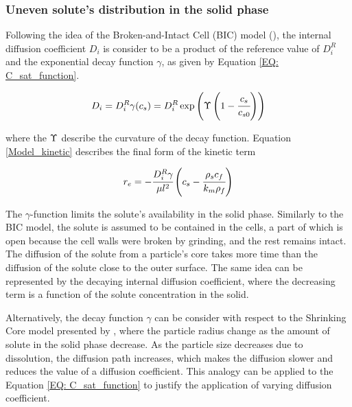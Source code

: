 \documentclass[../Article_Model_Parameters.tex]{subfiles}
\begin{document}
	
	\subsubsection{Uneven solute's distribution in the solid phase} \label{CH: Gamma_Function}
			
	Following the idea of the Broken-and-Intact Cell (BIC) model (\citet{Sovova2017}), the internal diffusion coefficient $D_i$ is consider to be a product of the reference value of $D_i^R$ and the exponential decay function $\gamma$, as given by Equation \ref{EQ: C_sat_function}.
		
	{\footnotesize
		\begin{equation}
			D_i = D_i^R \gamma(c_s) = D_i^R \exp \left( \Upsilon \left( 1-\cfrac{ c_s }{c_{s0}} \right) \right) \label{EQ: C_sat_function}
		\end{equation} }
	
	where the ${\color{black}\Upsilon}$ describe the curvature of the decay function. Equation \ref{Model_kinetic} describes the final form of the kinetic term
			
	{\footnotesize
		\begin{equation}
			\label{Model_kinetic}
				r_e = -\cfrac{D_i^R \gamma }{ \mu l^2 } \left( c_s  - \cfrac{\rho_s c_f }{ k_m \rho_f }  \right)
		\end{equation} }
	
	The $\gamma$-function limits the solute's availability in the solid phase. Similarly to the BIC model, the solute is assumed to be contained in the cells, a part of which is open because the cell walls were broken by grinding, and the rest remains intact. The diffusion of the solute from a particle's core takes more time than the diffusion of the solute close to the outer surface. The same idea can be represented by the decaying internal diffusion coefficient, where the decreasing term is a function of the solute concentration in the solid. 
	
	Alternatively, the decay function $\gamma$ can be consider with respect to the Shrinking Core model presented by \citet{Goto1996}, where the particle radius change as the amount of solute in the solid phase decrease. As the particle size decreases due to dissolution, the diffusion path increases, which makes the diffusion slower and reduces the value of a diffusion coefficient. This analogy can be applied to the Equation \ref{EQ: C_sat_function} to justify the application of varying diffusion coefficient.
		
\end{document}
